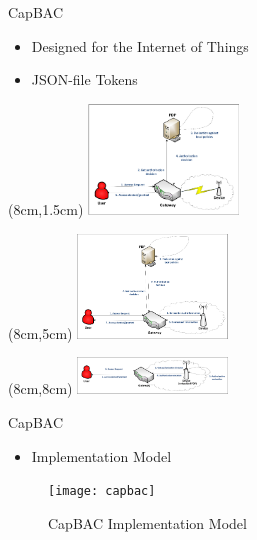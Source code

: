 \documentclass[11pt]{beamer}
\begin{document}
\begin{frame}{CapBAC}
    \begin{itemize}
    \vfill
    \item Designed for the Internet of Things
    \vfill
    \item JSON-file Tokens
    \vfill
    \end{itemize}
    \begin{textblock*}{2.5cm}(8cm,1.5cm)
        \includegraphics[width=4cm]{img/centralized.png}
    \end{textblock*}
    \begin{textblock*}{2.5cm}(8cm,5cm)
        \includegraphics[width=4cm]{img/CAcentralized.png}
    \end{textblock*}
    \begin{textblock*}{2.5cm}(8cm,8cm)
        \includegraphics[width=4cm]{img/distributed.png}
    \end{textblock*}
\end{frame}


\begin{frame}{CapBAC}
    \vfill
    \begin{itemize}
    \item Implementation Model 
    \end{itemize}
        \vfill
    \begin{figure}
		  \texttt{[image: capbac]}
		  \caption{CapBAC Implementation Model}
    \end{figure}
    \vfill
\end{frame}
\end{document}
